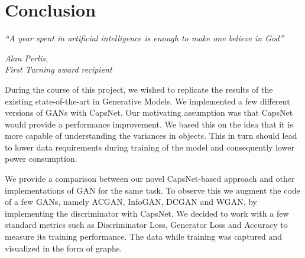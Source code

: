 \chapter{Conclusion}\label{ch:conclusion}
\epigraph{\textit{\normalsize “A year spent in artificial intelligence is enough to make one believe in God”}}{\textit{ \normalsize Alan Perlis,\\ First Turning award recipient}}

During the course of this project, we wished to replicate the results of the existing state-of-the-art in Generative Models. We implemented a few different versions of GANs with CapsNet. Our motivating assumption was that CapsNet would provide a performance improvement. We based this on the idea that it is more capable of understanding the variances in objects. This in turn should lead to lower data requirements during training of the model and consequently lower power consumption. 

\par\bigskip We provide a comparison between our novel CapsNet-based approach and other implementations of GAN for the same task. To observe this we augment the code of a few GANs, namely ACGAN, InfoGAN, DCGAN and WGAN, by implementing the discriminator with CapsNet. We decided to work with a few standard metrics such as Discriminator Loss, Generator Loss and Accuracy to measure its training performance. The data while training was captured and visualized in the form of graphs.

\par\bigskip %


